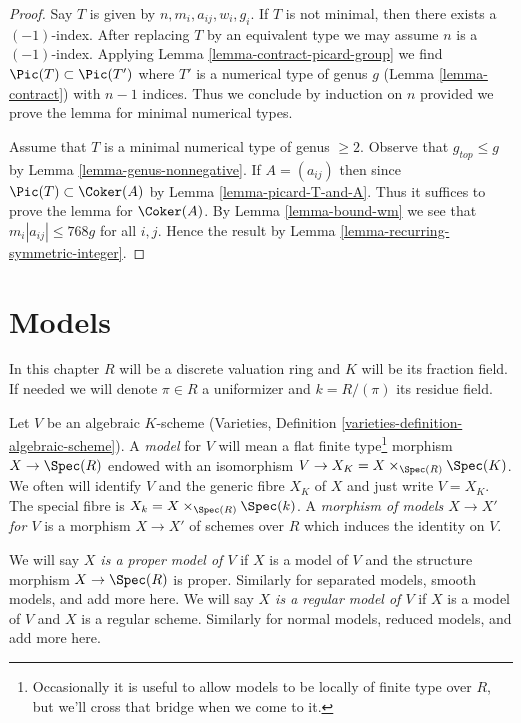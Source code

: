 \begin{proof}
Say $T$ is given by $n, m_i, a_{ij}, w_i, g_i$.
If $T$ is not minimal, then there exists a $(-1)$-index.
After replacing $T$ by an equivalent type we may assume
$n$ is a $(-1)$-index. Applying Lemma \ref{lemma-contract-picard-group}
we find $\Pic(T) \subset \Pic(T')$ where $T'$
is a numerical type of genus $g$ (Lemma \ref{lemma-contract})
with $n - 1$ indices. Thus we conclude by induction on $n$
provided we prove the lemma for minimal numerical types.

\medskip\noindent
Assume that $T$ is a minimal numerical type of genus $\geq 2$.
Observe that $g_{top} \leq g$ by Lemma \ref{lemma-genus-nonnegative}.
If $A = (a_{ij})$ then since $\Pic(T) \subset \Coker(A)$
by Lemma \ref{lemma-picard-T-and-A}. Thus it suffices to prove
the lemma for $\Coker(A)$.
By Lemma \ref{lemma-bound-wm} we see that $m_i|a_{ij}| \leq 768g$ for
all $i, j$.
Hence the result by Lemma \ref{lemma-recurring-symmetric-integer}.
\end{proof}







\section{Models}
\label{section-models}

\noindent
In this chapter $R$ will be a discrete valuation ring and $K$ will
be its fraction field. If needed we will denote $\pi \in R$ a
uniformizer and $k = R/(\pi)$ its residue field.

\medskip\noindent
Let $V$ be an algebraic $K$-scheme
(Varieties, Definition \ref{varieties-definition-algebraic-scheme}).
A {\it model} for $V$ will
mean a flat finite type\footnote{Occasionally it is useful to
allow models to be locally of finite type over $R$, but we'll
cross that bridge when we come to it.}
morphism $X \to \Spec(R)$ endowed with
an isomorphism $V \to X_K = X \times_{\Spec(R)} \Spec(K)$. We often
will identify $V$ and the generic fibre $X_K$ of $X$ and
just write $V = X_K$.
The special fibre is $X_k = X \times_{\Spec(R)} \Spec(k)$.
A {\it morphism of models $X \to X'$ for $V$}
is a morphism $X \to X'$ of schemes over $R$ which induces
the identity on $V$.

\medskip\noindent
We will say {\it $X$ is a proper model of $V$} if $X$ is a model
of $V$ and the structure morphism $X \to \Spec(R)$ is proper.
Similarly for separated models, smooth models, and add more here.
We will say {\it $X$ is a regular model of $V$} if $X$ is a model
of $V$ and $X$ is a regular scheme.
Similarly for normal models, reduced models, and add more here.

